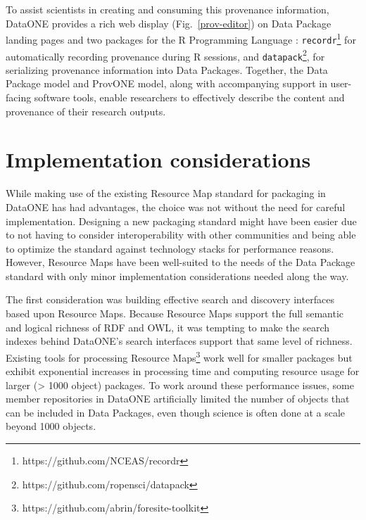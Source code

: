 \documentclass[conference]{IEEEtran}
\begin{document}
To assist scientists in creating and consuming this provenance information, DataONE provides a rich web display (Fig.~\ref{prov-editor}) on Data Package landing pages and two packages for the R Programming Language \cite{rcoreteam2018}: \texttt{recordr}\footnote{https://github.com/NCEAS/recordr} for automatically recording provenance during R sessions, and \texttt{datapack}\footnote{https://github.com/ropensci/datapack}, for serializing provenance information into Data Packages.
Together, the Data Package model and ProvONE model, along with accompanying support in user-facing software tools, enable researchers to effectively describe the content and provenance of their research outputs.

\section{Implementation considerations}

While making use of the existing Resource Map standard for packaging in DataONE has had advantages, the choice was not without the need for careful implementation.
Designing a new packaging standard might have been easier due to not having to consider interoperability with other communities and being able to optimize the standard against technology stacks for performance reasons.
However, Resource Maps have been well-suited to the needs of the Data Package standard with only minor implementation considerations needed along the way.

The first consideration was building effective search and discovery interfaces based upon Resource Maps.
Because Resource Maps support the full semantic and logical richness of RDF and OWL, it was tempting to make the search indexes behind DataONE’s search interfaces support that same level of richness.
Existing tools for processing Resource Maps\footnote{https://github.com/abrin/foresite-toolkit} work well for smaller packages but exhibit exponential increases in processing time and computing resource usage for larger (> 1000 object) packages.
To work around these performance issues, some member repositories in DataONE artificially limited the number of objects that can be included in Data Packages, even though science is often done at a scale beyond 1000 objects.
\end{document}
